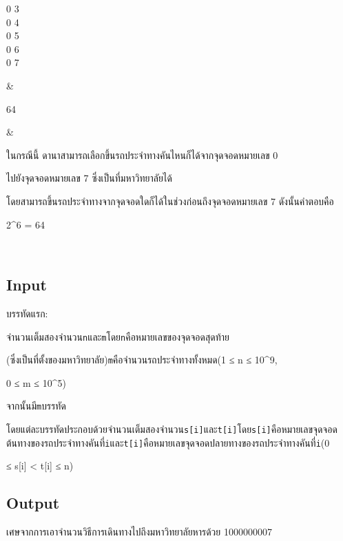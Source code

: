 \documentclass{article}
\begin{document}
{\begin{longtable}[]
\begin{minipage}[t]{\linewidth}
0 3\\

0 4\\

0 5\\

0 6\\

0 7\\

\strut

\end{minipage} & \begin{minipage}[t]{\linewidth}\raggedright

64\\

\strut

\end{minipage} & \begin{minipage}[t]{\linewidth}\raggedright

ในกรณีนี้ ดานาสามารถเลือกขึ้นรถประจำทางคันไหนก็ได้จากจุดจอดหมายเลข 0

ไปยังจุดจอดหมายเลข 7 ซึ่งเป็นที่มหาวิทยาลัยได้

โดยสามารถขึ้นรถประจำทางจากจุดจอดใดก็ได้ในช่วงก่อนถึงจุดจอดหมายเลข 7 ดังนั้นคำตอบคือ

2\^{}6 = 64\\

\strut

\end{minipage} \\

\end{longtable}

}



\subsection*{Input}
บรรทัดแรก:

จำนวนเต็มสองจำนวน\texttt{n}และ\texttt{m}โดย\texttt{n}คือหมายเลขของจุดจอดสุดท้าย

(ซึ่งเป็นที่ตั้งของมหาวิทยาลัย)\texttt{m}คือจำนวนรถประจำทางทั้งหมด(1 ≤ n ≤ 10\^{}9,

0 ≤ m ≤ 10\^{}5)



จากนั้นมี\texttt{m}บรรทัด

โดยแต่ละบรรทัดประกอบด้วยจำนวนเต็มสองจำนวน\texttt{s{[}i{]}}และ\texttt{t{[}i{]}}โดย\texttt{s{[}i{]}}คือหมายเลขจุดจอดต้นทางของรถประจำทางคันที่\texttt{i}และ\texttt{t{[}i{]}}คือหมายเลขจุดจอดปลายทางของรถประจำทางคันที่\texttt{i}(0

≤ s{[}i{]} \textless{} t{[}i{]} ≤ n)



\subsection*{Output}
{เศษจากการเอาจำนวนวิธีการเดินทางไปถึงมหาวิทยาลัยหารด้วย 1000000007}\\
\end{document}
